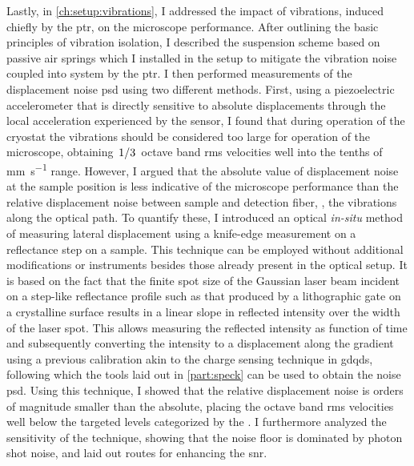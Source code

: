 Lastly, in \cref{ch:setup:vibrations}, I addressed the impact of vibrations, induced chiefly by the \gls{ptr}, on the microscope performance.
After outlining the basic principles of vibration isolation, I described the suspension scheme based on passive air springs which I installed in the setup to mitigate the vibration noise coupled into system by the \gls{ptr}.
I then performed measurements of the displacement noise \gls{psd} using two different methods.
First, using a piezoelectric accelerometer that is directly sensitive to absolute displacements through the local acceleration experienced by the sensor, I found that during operation of the cryostat the vibrations should be considered too large for operation of the microscope, obtaining $\flatfrac{1}{3}$ octave band \gls{rms} velocities well into the tenths of \unit{\milli\meter\per\second} range.
However, I argued that the absolute value of displacement noise at the sample position is less indicative of the microscope performance than the relative displacement noise between sample and detection fiber, \ie, the vibrations along the optical path.
To quantify these, I introduced an optical \emph{in-situ} method of measuring lateral displacement using a knife-edge measurement on a reflectance step on a sample.
This technique can be employed without additional modifications or instruments besides those already present in the optical setup.
It is based on the fact that the finite spot size of the Gaussian laser beam incident on a step-like reflectance profile such as that produced by a lithographic  gate on a crystalline surface results in a linear slope in reflected intensity over the width of the laser spot.
This allows measuring the reflected intensity as function of time and subsequently converting the intensity to a displacement along the gradient using a previous calibration akin to the charge sensing technique in \glspl{gdqd}, following which the tools laid out in \cref{part:speck} can be used to obtain the noise \gls{psd}.
Using this technique, I showed that the relative displacement noise is orders of magnitude smaller than the absolute, placing the octave band \gls{rms} velocities well below the targeted levels categorized by the .
I furthermore analyzed the sensitivity of the technique, showing that the noise floor is dominated by photon shot noise, and laid out routes for enhancing the \gls{snr}.


